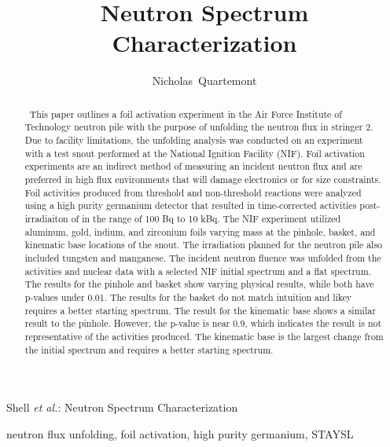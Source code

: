 \documentclass[journal]{IEEEtran}
\begin{document}
	\title{Neutron Spectrum Characterization}
	
	\author{Nicholas~Quartemont}
	
	{Shell \MakeLowercase{\textit{et al.}}: Neutron Spectrum Characterization }

	\maketitle
	
	\begin{abstract}
		\ This paper outlines a foil activation experiment in the Air Force Institute of Technology neutron pile with the purpose of unfolding the neutron flux in stringer 2. Due to facility limitations, the unfolding analysis was conducted on an experiment with a test snout performed at the National Ignition Facility (NIF). Foil activation experiments are an indirect method of measuring an incident neutron flux and are preferred in high flux environments that will damage electronics or for size constraints. Foil activities produced from threshold and non-threshold reactions were analyzed using a high purity germanium detector that resulted in time-corrected activities post-irradiaiton of in the range of 100 Bq to 10 kBq. The NIF experiment utilized aluminum, gold, indium, and zirconium foils varying mass at the pinhole, basket, and kinematic base locations of the snout. The irradiation planned for the neutron pile also included tungsten and manganese. The incident neutron fluence was unfolded from the activities and nuclear data with a selected NIF initial spectrum and a flat spectrum. The results for the pinhole and basket show varying physical results, while both have p-values under 0.01. The results for the basket do not match intuition and likey requires a better starting spectrum. The result for the kinematic base shows a similar result to the pinhole. However, the p-value is near 0.9, which indicates the result is not representative of the activities produced. The kinematic base is the largest change from the initial spectrum and requires a better starting spectrum. 
	\end{abstract}
	
	\begin{IEEEkeywords}
		neutron flux unfolding, foil activation, high purity germanium, STAYSL 
	\end{IEEEkeywords}
	
\end{document}
